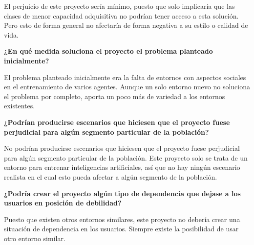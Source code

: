 El perjuicio de este proyecto sería mínimo, puesto que solo implicaría que las clases de menor capacidad adquisitiva no podrían tener acceso a esta solución. Pero esto de forma general no afectaría de forma negativa a su estilo o calidad de vida.

\textbf{¿En qué medida soluciona el proyecto el problema planteado inicialmente?}

El problema planteado inicialmente era la falta de entornos con aspectos sociales en el entrenamiento de varios agentes. Aunque un solo entorno nuevo no soluciona el problema por completo, aporta un poco más de variedad a los entornos existentes.

\textbf{¿Podrían producirse escenarios que hiciesen  que el proyecto fuese perjudicial para algún segmento particular de la población?}

No podrían producirse escenarios que hiciesen que el proyecto fuese perjudicial para algún segmento particular de la población. Este proyecto solo se trata de un entorno para entrenar inteligencias artificiales, así que no hay ningún escenario realista en el cual esto pueda afectar a algún segmento de la población.

\textbf{¿Podría crear el proyecto algún tipo de dependencia que dejase a los usuarios en posición de debilidad?}

Puesto que existen otros entornos similares, este proyecto no debería crear una situación de dependencia en los usuarios. Siempre existe la posibilidad de usar otro entorno similar.


